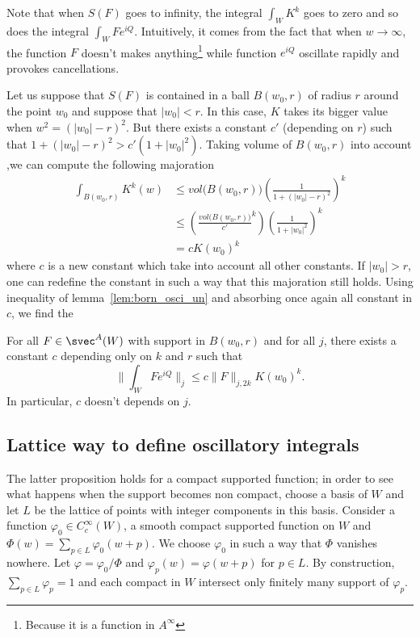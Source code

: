 Note that when $S(F)$ goes to infinity, the integral $\int_WK^k$ goes to zero and so does the integral $\int_WFe^{iQ}$. Intuitively, it comes from the fact that when $w\to\infty$, the function $F$ doesn't makes anything\footnote{Because it is a function in $A^{\infty}$}  while function $e^{iQ}$ oscillate rapidly and provokes cancellations.

Let us suppose that $S(F)$ is contained in a ball $B(w_0,r)$ of radius $r$ around the point $w_0$ and suppose that $| w_0 |<r$. In this case, $K$ takes its bigger value when $w^2=(| w_0 |-r)^2$. But there exists a constant $c'$ (depending on $r$) such that $1+(| w_0 |-r)^2>c'(1+| w_0 |^2)$. Taking volume of $B(w_0,r)$ into account ,we can compute the following majoration
\begin{equation}
	\begin{split}
		\int_{B(w_0,r)}K^k(w)&\leq vol\big(B(w_0,r)\big)\left( \frac{1}{1+(| w_0 |-r)^2} \right)^k\\
		&\leq \left( \frac{vol\big( B(w_0,r) \big)}{c'}^k \right)\left( \frac{1}{1+| w_0 |^2} \right)^k\\
		&=cK(w_0)^k
	\end{split}
\end{equation}
where $c$ is a new constant which take into account all other constants. If $| w_0 |>r$, one can redefine the constant in such a way that this majoration still holds. Using inequality of lemma~\ref{lem:born_osci_un} and absorbing once again all constant in $c$, we find the

\begin{proposition}
	For all $F\in\svec^A(W)$ with support in $B(w_0,r)$ and for all $j$, there exists a constant $c$ depending only on $k$ and $r$ such that
	\begin{equation}
		\| \int_WFe^{iQ} \|_j\leq c\| F \|_{j,2k}K(w_0)^k.
	\end{equation}
	In particular, $c$ doesn't depends on $j$.
\end{proposition}


\subsection{Lattice way to define oscillatory integrals}

The latter proposition holds for a compact supported function; in order to see what happens when the support becomes non compact, choose a basis of $W$ and let $L$ be the lattice of points with integer components in this basis. Consider a function $\varphi_0\in C^{\infty}_c(W)$, a smooth compact supported function on $W$ and $\Phi(w)=\sum_{p\in L}\varphi_0(w+p)$. We choose $\varphi_0$ in such a way that $\Phi$ vanishes nowhere. Let $\varphi=\varphi_0/\Phi$ and $\varphi_p(w)=\varphi(w+p)$ for $p\in L$. By construction, $\sum_{p\in L}\varphi_p=1$ and each compact in $W$ intersect only finitely many support of $\varphi_p$.

